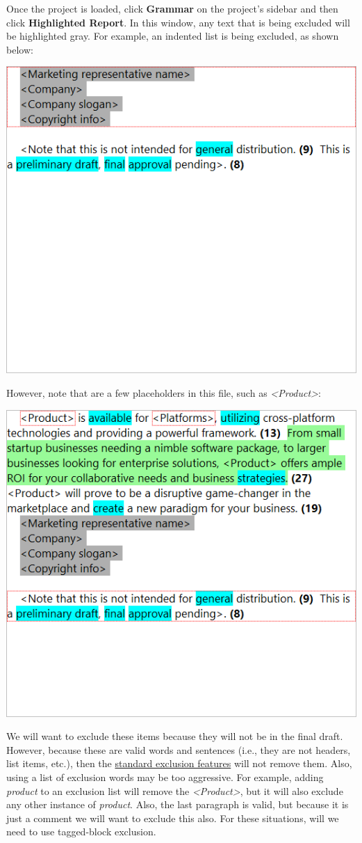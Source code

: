 \documentclass[
]{book}
\theoremstyle{definition}
\theoremstyle{definition}
\theoremstyle{definition}
\theoremstyle{definition}
\theoremstyle{remark}
\begin{document}
Once the project is loaded, click \textbf{Grammar} on the project's sidebar and then click \textbf{Highlighted Report}. In this window, any text that is being excluded will be highlighted gray. For example, an indented list is being excluded, as shown below:

\begin{center}\includegraphics[width=0.75\linewidth,]{Images/ExclusionTagsExampleListExcluded} \end{center}

However, note that are a few placeholders in this file, such as \emph{\textless Product\textgreater{}}:

\begin{center}\includegraphics[width=0.75\linewidth,]{Images/ExclusionTagsExampleNotExcluding} \end{center}

We will want to exclude these items because they will not be in the final draft. However, because these are valid words and sentences (i.e., they are not headers, list items, etc.), then the \protect\hyperlink{options-text-exclusion}{standard exclusion features} will not remove them. Also, using a list of exclusion words may be too aggressive. For example, adding \emph{product} to an exclusion list will remove the \emph{\textless Product\textgreater{}}, but it will also exclude any other instance of \emph{product}. Also, the last paragraph is valid, but because it is just a comment we will want to exclude this also. For these situations, will we need to use tagged-block exclusion.
\end{document}
